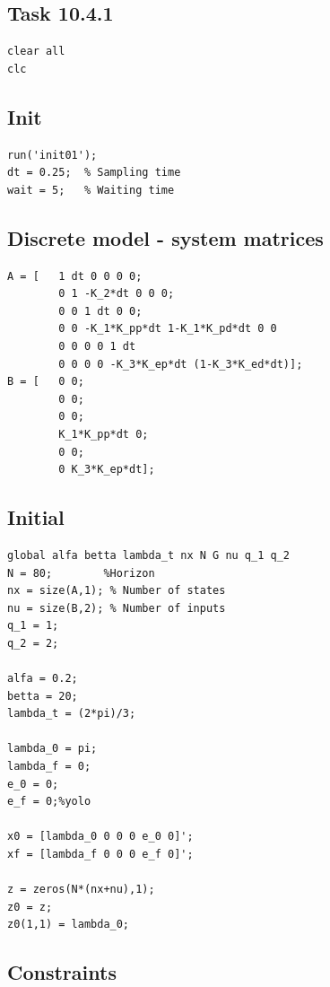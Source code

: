\documentclass[11pt,a4paper,USenglish]{article} %
\begin{document}
\subsection{Task 10.4.1}

\begin{verbatim}
clear all
clc
\end{verbatim}


\subsection*{Init}

\begin{verbatim}
run('init01');
dt = 0.25;  % Sampling time
wait = 5;   % Waiting time
\end{verbatim} \color{black}
    

\subsection*{Discrete model - system matrices}

\begin{verbatim}
A = [   1 dt 0 0 0 0;
        0 1 -K_2*dt 0 0 0;
        0 0 1 dt 0 0;
        0 0 -K_1*K_pp*dt 1-K_1*K_pd*dt 0 0
        0 0 0 0 1 dt
        0 0 0 0 -K_3*K_ep*dt (1-K_3*K_ed*dt)];
B = [   0 0;
        0 0;
        0 0;
        K_1*K_pp*dt 0;
        0 0;
        0 K_3*K_ep*dt];
\end{verbatim}


\subsection*{Initial}

\begin{verbatim}
global alfa betta lambda_t nx N G nu q_1 q_2
N = 80;        %Horizon
nx = size(A,1); % Number of states
nu = size(B,2); % Number of inputs
q_1 = 1;
q_2 = 2;

alfa = 0.2;
betta = 20;
lambda_t = (2*pi)/3;

lambda_0 = pi;
lambda_f = 0;
e_0 = 0;
e_f = 0;%yolo

x0 = [lambda_0 0 0 0 e_0 0]';
xf = [lambda_f 0 0 0 e_f 0]';

z = zeros(N*(nx+nu),1);
z0 = z;
z0(1,1) = lambda_0;
\end{verbatim}


\subsection*{Constraints}
\end{document}
